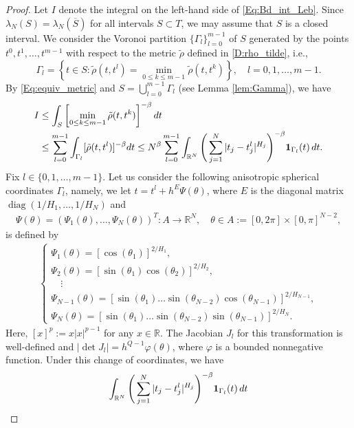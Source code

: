 \documentclass[11pt, reqno]{amsart}
\def\R{{\mathbb R}}
\numberwithin{equation}{section}
\begin{document}
\begin{proof}
Let $I$ denote the integral on the left-hand side of \eqref{Eq:Bd_int_Leb}.
Since $\lambda_N(S) = \lambda_N(\overline{S})$ for all intervals $S \subset T$, we may assume that $S$ is a closed interval.
We consider the Voronoi partition $\{\Gamma_l\}_{l=0}^{m-1}$ of $S$ generated by the points $t^0, t^1, \dots, t^{m-1}$ 
with respect to the metric $\tilde\rho$ defined in \eqref{D:rho_tilde}, i.e.,
\[\Gamma_l = \left\{ t \in S : \tilde\rho(t, t^l) = \min_{0 \le k \le m-1} \tilde\rho(t, t^k) \right\}, \quad l = 0, 1, \dots, m-1.\]
By \eqref{Eq:equiv_metric} and $S = \bigcup_{l=0}^{m-1} \Gamma_l$ (see Lemma \ref{lem:Gamma}), we have
\begin{align*}
I & \le  \int_S \left[ \min_{0\le k \le m-1} \tilde\rho(t, t^k) \right]^{-\beta} dt\\
&\le \sum_{l = 0}^{m-1} \int_{\Gamma_l} [\tilde\rho(t, t^l)]^{-\beta} dt
\le N^\beta \sum_{l = 0}^{m-1} \int_{\R^N} \Bigg(\sum_{j=1}^N|t_j - t^l_j|^{H_j}\Bigg)^{-\beta} {\bf 1}_{\Gamma_l}(t) \, dt.
\end{align*}
Fix $l \in \{0, 1, \dots, m-1\}$.
Let us consider the following anisotropic spherical coordinates $\Gamma_l$, namely, we let $t = t^l + h^E\Psi(\theta)$, 
where $E$ is the diagonal matrix $\operatorname{diag}(1/H_1, \dots, 1/H_N)$ and 
\begin{align*}
\Psi(\theta) = (\Psi_1(\theta), \dots, \Psi_N(\theta))^T: A \to \R^N, \quad \theta \in A := [0, 2\pi] \times [0, \pi]^{N-2},
\end{align*}
is defined by
\begin{align*}
\begin{cases}
\Psi_1(\theta) = [\cos(\theta_1)]^{2/H_1},\\
\Psi_2(\theta) = [\sin(\theta_1) \cos(\theta_2)]^{2/H_2},\\
\quad \vdots\\
\Psi_{N-1}(\theta) = [\sin(\theta_1) \dots \sin(\theta_{N-2}) \cos(\theta_{N-1})]^{2/H_{N-1}},\\
\Psi_N(\theta) = [\sin(\theta_1) \dots \sin(\theta_{N-2}) \sin(\theta_{N-1})]^{2/H_N}.
\end{cases}
\end{align*}
Here, $[x]^p := x |x|^{p-1}$ for any $x \in \R$.
The Jacobian $J_l$ for this transformation is well-defined and $|\det J_l| = h^{Q-1} \varphi(\theta)$, where $\varphi$ is a bounded 
nonnegative function. Under this change of coordinates, we have
\begin{align*}
\int_{\R^N} \Bigg(\sum_{j=1}^N|t_j - t^l_j|^{H_j}\Bigg)^{-\beta} {\bf 1}_{\Gamma_l}(t) \, dt

\end{align*}
\end{proof}
\end{document}
